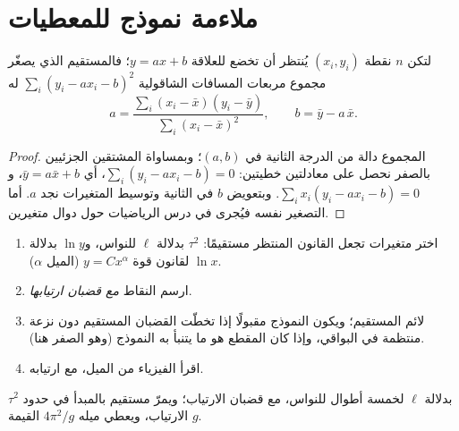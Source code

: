 \section{ملاءمة نموذج للمعطيات}

\begin{proposition}\label{prop:b1:units-dimensions:regression}
لتكن $n$ نقطة $(x_i, y_i)$ يُنتظر أن تخضع للعلاقة $y = a x + b$؛
فالمستقيم الذي يصغّر مجموع مربعات المسافات الشاقولية
$\sum_i (y_i - a x_i - b)^2$ له
\[
a = \frac{\sum_i (x_i - \bar x)(y_i - \bar y)}{\sum_i (x_i - \bar x)^2},
\qquad
b = \bar y - a\,\bar x .
\]
\end{proposition}

\begin{proof}
المجموع دالة من الدرجة الثانية في $(a, b)$؛ وبمساواة المشتقين
الجزئيين بالصفر نحصل على معادلتين خطيتين:
$\sum_i (y_i - ax_i - b) = 0$، أي $\bar y = a \bar x + b$، و
$\sum_i x_i (y_i - ax_i - b) = 0$. وبتعويض $b$ في الثانية وتوسيط
المتغيرات نجد $a$. أما التصغير نفسه فيُجرى في درس الرياضيات حول دوال
متغيرين.
\end{proof}

\begin{method}\label{met:b1:units-dimensions:fit}
\begin{enumerate}
  \item اختر متغيرات تجعل القانون المنتظر مستقيمًا:
        $\tau^2$ بدلالة $\ell$ للنواس، و$\ln y$ بدلالة
        $\ln x$ لقانون قوة $y = Cx^\alpha$ (الميل $\alpha$).
  \item ارسم النقاط \emph{مع قضبان ارتيابها}.
  \item لائم المستقيم؛ ويكون النموذج مقبولًا إذا تخطّت القضبان
        المستقيم دون نزعة منتظمة في البواقي، وإذا كان المقطع هو ما
        يتنبأ به النموذج (وهو الصفر هنا).
  \item اقرأ الفيزياء من الميل، مع ارتيابه.
\end{enumerate}
\end{method}

\begin{omfigure}

{\small $\tau^2$ بدلالة $\ell$ لخمسة أطوال للنواس، مع قضبان الارتياب؛
ويمرّ مستقيم  بالمبدأ في حدود الارتياب، ويعطي ميله
$4\pi^2/g$ القيمة $g$.}
\end{omfigure}

